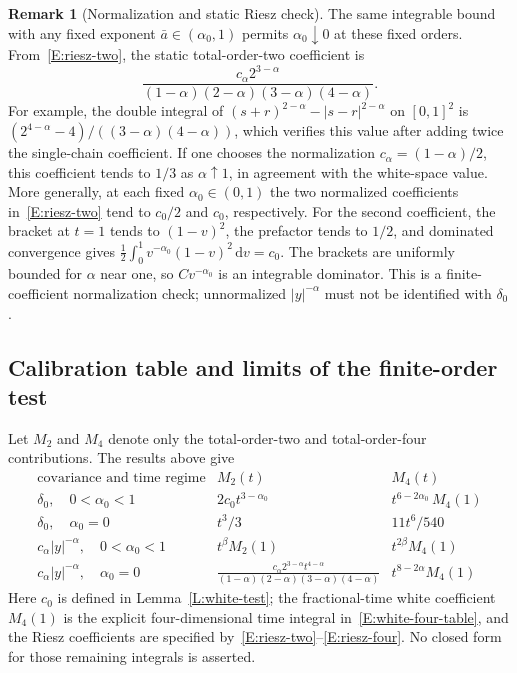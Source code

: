 \documentclass[12pt]{article}
\numberwithin{equation}{section}
\theoremstyle{definition}
\newtheorem{remark}[theorem]{Remark}
\newcommand{\ud}{\,\mathrm{d}}
\begin{document}
\begin{remark}[Normalization and static Riesz check]\label{R:riesz-static}
  The same integrable bound with any fixed exponent
  $\bar a\in(\alpha_0,1)$ permits $\alpha_0\downarrow0$ at these
  fixed orders. From~\eqref{E:riesz-two}, the static total-order-two
  coefficient is
  \[
    \frac{c_\alpha2^{3-\alpha}}
    {(1-\alpha)(2-\alpha)(3-\alpha)(4-\alpha)}.
  \]
  For example, the double integral of
  $(s+r)^{2-\alpha}-|s-r|^{2-\alpha}$ on $[0,1]^2$ is
  $(2^{4-\alpha}-4)/((3-\alpha)(4-\alpha))$, which verifies this value
  after adding twice the single-chain coefficient.
  If one chooses the normalization $c_\alpha=(1-\alpha)/2$, this
  coefficient tends to $1/3$ as $\alpha\uparrow1$, in agreement with
  the white-space value. More generally, at each fixed $\alpha_0\in(0,1)$
  the two normalized coefficients in~\eqref{E:riesz-two} tend to
  $c_0/2$ and $c_0$, respectively. For the second coefficient, the bracket
  at $t=1$ tends to $(1-v)^2$, the prefactor tends to $1/2$, and dominated
  convergence gives
  $\frac12\int_0^1v^{-\alpha_0}(1-v)^2\ud v=c_0$.
  The brackets are uniformly bounded for $\alpha$ near one, so
  $Cv^{-\alpha_0}$ is an integrable dominator. This is a finite-coefficient
  normalization check; unnormalized $|y|^{-\alpha}$ must not be identified
  with $\delta_0$.
\end{remark}

\subsection{Calibration table and limits of the finite-order test}

Let $M_2$ and $M_4$ denote only the total-order-two and total-order-four
contributions. The results above give
\[
  \begin{array}{c|c|c}
    \text{covariance and time regime}&M_2(t)&M_4(t)\\ \hline
    \delta_0,\quad0<\alpha_0<1
    &2c_0t^{3-\alpha_0}&t^{6-2\alpha_0}\,M_4(1)\\
    \delta_0,\quad\alpha_0=0
    &t^3/3&11t^6/540\\
    c_\alpha|y|^{-\alpha},\quad0<\alpha_0<1
    &t^\beta M_2(1)&t^{2\beta}M_4(1)\\
    c_\alpha|y|^{-\alpha},\quad\alpha_0=0
    &\displaystyle\frac{c_\alpha2^{3-\alpha}t^{4-\alpha}}
    {(1-\alpha)(2-\alpha)(3-\alpha)(4-\alpha)}
    &t^{8-2\alpha}M_4(1)
  \end{array}
\]
Here $c_0$ is defined in Lemma~\ref{L:white-test}; the fractional-time
white coefficient $M_4(1)$ is the explicit four-dimensional time integral
in~\eqref{E:white-four-table}, and the Riesz coefficients are specified
by~\eqref{E:riesz-two}--\eqref{E:riesz-four}. No closed form for those
remaining integrals is asserted.
\end{document}
